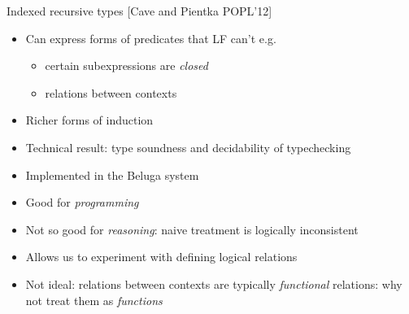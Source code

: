 \documentclass[usenames,dvipsnames]{beamer}
\begin{document}

\begin{frame}{Indexed recursive types [Cave and Pientka POPL'12]}
\begin{itemize}
\item Can express forms of predicates that LF can't e.g.
\begin{itemize}
\item certain subexpressions are \emph{closed}
\item relations between contexts
\end{itemize}
\item Richer forms of induction
\item Technical result: type soundness and decidability of typechecking
\item Implemented in the Beluga system
\item Good for \emph{programming}
\item Not so good for \emph{reasoning}: naive treatment is logically inconsistent
\item Allows us to experiment with defining logical relations
\item Not ideal: relations between contexts are typically \emph{functional} relations: why not treat them as \emph{functions}
\end{itemize}
\end{frame}
\end{document}
